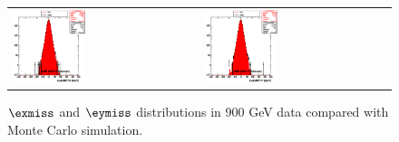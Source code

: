 \begin{figure}[h!]
 \centering
 \begin{tabular}{ll}
  \includegraphics[width=0.40\textwidth]{plots_DataVsMC_MB_900GeV/h_calometPx.eps} &
  \includegraphics[width=0.40\textwidth]{plots_DataVsMC_MB_900GeV/h_calometPy.eps} \\
 \end{tabular}
 \caption{$\exmiss$ and $\eymiss$ distributions in 900 GeV data compared
   with Monte Carlo simulation.
          \label{fig:DataVsMC_MB_900_2}}
\end{figure}

